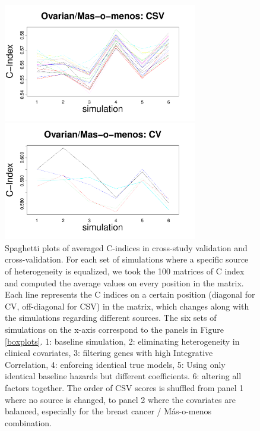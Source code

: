 \documentclass{article}
\begin{document}
\begin{figure}[H]
\begin{minipage}[b]{0.5\textwidth}
        \end{minipage}
        \begin{minipage}[b]{0.5\textwidth}
            \includegraphics[width=8.5cm]{ovarian_masomenos_CSV.pdf}
        \end{minipage}%
        \begin{minipage}[b]{0.5\textwidth}
            \includegraphics[width=8.5cm]{ovarian_masomenos_CV.pdf}
        \end{minipage}
    \caption{Spaghetti plots of averaged C-indices in cross-study validation and cross-validation. For each set of simulations where a specific source of heterogeneity is equalized, we took the 100 matrices of C index and computed the average values on every position in the matrix. Each line represents the C indices on a certain position (diagonal for CV, off-diagonal for CSV) in the matrix, which changes along with the simulations regarding different sources. The six sets of simulations on the x-axis correspond to the panels in Figure \ref{boxplots}. 1: baseline simulation, 2: eliminating heterogeneity in clinical covariates, 3: filtering genes with high Integrative Correlation, 4: enforcing identical true models, 5: Using only identical baseline hazards but different coefficients. 6: altering all factors together. The order of CSV scores is shuffled from panel 1 where no source is changed, to panel 2 where the covariates are balanced, especially for the breast cancer / M\'{a}s-o-menos combination. }
    \label{spaghetti}
  \end{figure}
\end{document}
